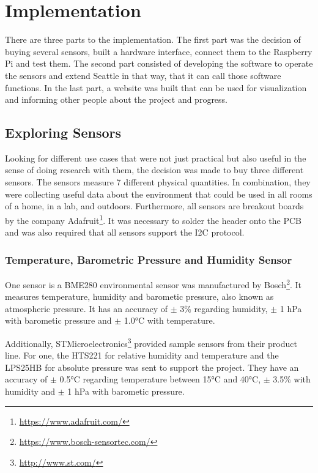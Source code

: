 \documentclass{article}      %
\begin{document}
\section{Implementation} \label{sec:implementation}

There are three parts to the implementation. The first part was the decision of buying several sensors, built a hardware interface, connect them to the Raspberry Pi and test them. The second part consisted of developing the software to operate the sensors and extend Seattle in that way, that it can call those software functions. In the last part, a website was built that can be used for visualization and informing other people about the project and progress.

\subsection{Exploring Sensors} \label{sensorDesc}

Looking for different use cases that were not just practical but also useful in the sense of doing research with them, the decision was made to buy three different sensors. The sensors measure 7 different physical quantities. In combination, they were collecting useful data about the environment that could be used in all rooms of a home, in a lab, and outdoors. Furthermore, all sensors are breakout boards by the company Adafruit\footnote{\url{https://www.adafruit.com/}}. It was necessary to solder the header onto the \gls{PCB} and was also required that all sensors support the \gls{I2C} protocol.

\subsubsection{Temperature, Barometric Pressure and Humidity Sensor} 

One sensor is a BME280 environmental sensor was manufactured by Bosch\footnote{\url{https://www.bosch-sensortec.com/}}. It measures temperature, humidity and barometic pressure, also known as atmospheric pressure. It has an accuracy of $\pm$ 3\% regarding humidity, $\pm$ 1 \gls{hPa} with barometic pressure and $\pm$ 1.0°\gls{C} with temperature. \cite{bme280}

Additionally, STMicroelectronics\footnote{\url{http://www.st.com/}} provided sample sensors from their product line. For one, the HTS221 for relative humidity and temperature and the LPS25HB for absolute pressure was sent to support the project. They have an accuracy of $\pm$ 0.5°\gls{C} regarding temperature between 15°\gls{C} and 40°\gls{C}, $\pm$ 3.5\% with humidity and $\pm$ 1 hPa  with barometic pressure. \cite{stHum} \cite{stPress}
\end{document}
